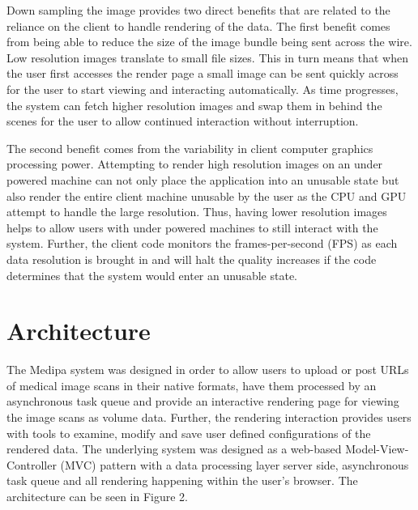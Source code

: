 \documentclass[annual]{acmsiggraph}
\begin{document}
Down sampling the image provides two direct benefits that are related to the reliance on the client to handle rendering of the data.  The first benefit comes from being able to reduce the size of the image bundle being sent across the wire.  Low resolution images translate to small file sizes.  This in turn means that when the user first accesses the render page a small image can be sent quickly across for the user to start viewing and interacting automatically.  As time progresses, the system can fetch higher resolution images and swap them in behind the scenes for the user to allow continued interaction without interruption.  

The second benefit comes from the variability in client computer graphics processing power.  Attempting to render high resolution images on an under powered machine can not only place the application into an unusable state but also render the entire client machine unusable by the user as the CPU and GPU attempt to handle the large resolution.  Thus, having lower resolution images helps to allow users with under powered machines to still interact with the system.  Further, the client code monitors the frames-per-second (FPS) as each data resolution is brought in and will halt the quality increases if the code determines that the system would enter an unusable state.

\section{Architecture}
	The Medipa system was designed in order to allow users to upload or post URLs of medical image scans in their native formats, have them processed by an asynchronous task queue and provide an interactive rendering page for viewing the image scans as volume data.  Further, the rendering interaction provides users with tools to examine, modify and save user defined configurations of the rendered data.
The underlying system was designed as a web-based Model-View-Controller (MVC) pattern with a data processing layer server side, asynchronous task queue and all rendering happening within the user's browser.  The architecture can be seen in Figure 2.
\end{document}
